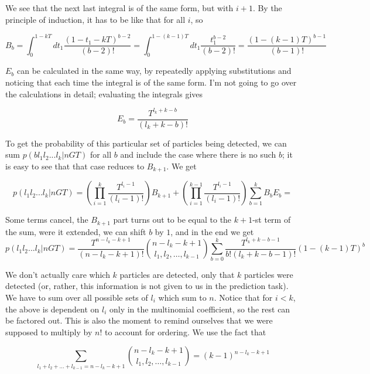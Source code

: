 \documentclass{../note}
\begin{document}
\begin{solution}
We see that the next last integral is of the same form, but with $i + 1$. By the principle of induction, it has to be like that for all $i$, so

\begin{equation*}
B_b = \int_{0}^{1-kT} dt_1 \frac{(1 - t_1 - kT)^{b-2}}{(b - 2)!} = \int_{0}^{1 - (k-1)T} dt_1 \frac{t_1^{b-2}}{(b-2)!} = \frac{(1 - (k-1)T)^{b-1}}{(b-1)!}
\end{equation*}

$E_b$ can be calculated in the same way, by repeatedly applying substitutions and noticing that each time the integral is of the same form. I'm not going to go over the calculations in detail; evaluating the integrals gives

\begin{equation*}
E_b = \frac{T^{l_k+k-b}}{(l_k+k-b)!}
\end{equation*}

To get the probability of this particular set of particles being detected, we can sum $p(b l_1 l_2 ... l_k | n G T)$ for all $b$ and include the case where there is no such $b$; it is easy to see that that case reduces to $B_{k+1}$. We get

\begin{equation*}
p(l_1 l_2 ... l_k | n G T) = \left(\prod_{i=1}^{k} \frac{T^{l_i - 1}}{(l_i - 1)!}\right) B_{k+1} + \left(\prod_{i=1}^{k-1} \frac{T^{l_i - 1}}{(l_i - 1)!}\right) \sum_{b=1}^{k} B_b E_b = 
\end{equation*}

Some terms cancel, the $B_{k+1}$ part turns out to be equal to the $k+1$-st term of the sum, were it extended, we can shift $b$ by $1$, and in the end we get
\begin{equation*}
p(l_1 l_2 ... l_k | n G T) = \frac{T^{n-l_k-k+1}}{(n-l_k-k+1)!} \binom{n-l_k-k+1}{l_1, l_2, \ldots, l_{k-1}} \sum_{b=0}^{k} \frac{T^{l_k+k-b-1}}{b!(l_k+k-b-1)!} (1-(k-1)T)^b
\end{equation*}

We don't actually care which $k$ particles are detected, only that $k$ particles were detected (or, rather, this information is not given to us in the prediction task). We have to sum over all possible sets of $l_i$ which sum to $n$. Notice that for $i < k$, the above is dependent on $l_i$ only in the multinomial coefficient, so the rest can be factored out. This is also the moment to remind ourselves that we were supposed to multiply by $n!$ to account for ordering. We use the fact that

\begin{equation*}
\sum_{l_1+l_2+\ldots+l_{k-1}=n-l_k-k+1} \binom{n-l_k-k+1}{l_1, l_2, \ldots, l_{k-1}} = (k-1)^{n-l_k-k+1}
\end{equation*}


\end{solution}
\end{document}
